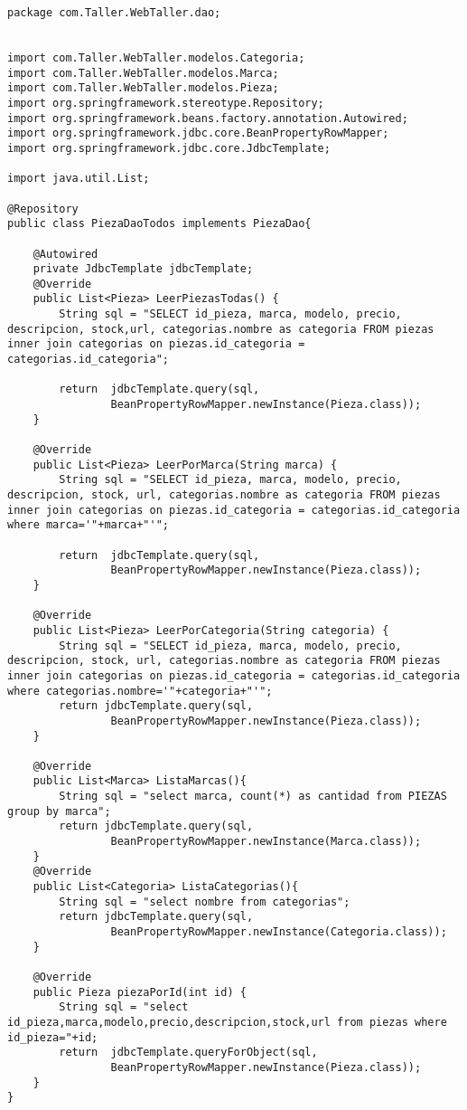 \begin{lstlisting}[caption=PiezaDaoTodos.java (LMSI)]
package com.Taller.WebTaller.dao;


import com.Taller.WebTaller.modelos.Categoria;
import com.Taller.WebTaller.modelos.Marca;
import com.Taller.WebTaller.modelos.Pieza;
import org.springframework.stereotype.Repository;
import org.springframework.beans.factory.annotation.Autowired;
import org.springframework.jdbc.core.BeanPropertyRowMapper;
import org.springframework.jdbc.core.JdbcTemplate;

import java.util.List;

@Repository
public class PiezaDaoTodos implements PiezaDao{

    @Autowired
    private JdbcTemplate jdbcTemplate;
    @Override
    public List<Pieza> LeerPiezasTodas() {
        String sql = "SELECT id_pieza, marca, modelo, precio, descripcion, stock,url, categorias.nombre as categoria FROM piezas inner join categorias on piezas.id_categoria = categorias.id_categoria";

        return  jdbcTemplate.query(sql,
                BeanPropertyRowMapper.newInstance(Pieza.class));
    }

    @Override
    public List<Pieza> LeerPorMarca(String marca) {
        String sql = "SELECT id_pieza, marca, modelo, precio, descripcion, stock, url, categorias.nombre as categoria FROM piezas inner join categorias on piezas.id_categoria = categorias.id_categoria where marca='"+marca+"'";

        return  jdbcTemplate.query(sql,
                BeanPropertyRowMapper.newInstance(Pieza.class));
    }

    @Override
    public List<Pieza> LeerPorCategoria(String categoria) {
        String sql = "SELECT id_pieza, marca, modelo, precio, descripcion, stock, url, categorias.nombre as categoria FROM piezas inner join categorias on piezas.id_categoria = categorias.id_categoria where categorias.nombre='"+categoria+"'";
        return jdbcTemplate.query(sql,
                BeanPropertyRowMapper.newInstance(Pieza.class));
    }

    @Override
    public List<Marca> ListaMarcas(){
        String sql = "select marca, count(*) as cantidad from PIEZAS group by marca";
        return jdbcTemplate.query(sql,
                BeanPropertyRowMapper.newInstance(Marca.class));
    }
    @Override
    public List<Categoria> ListaCategorias(){
        String sql = "select nombre from categorias";
        return jdbcTemplate.query(sql,
                BeanPropertyRowMapper.newInstance(Categoria.class));
    }

    @Override
    public Pieza piezaPorId(int id) {
        String sql = "select id_pieza,marca,modelo,precio,descripcion,stock,url from piezas where id_pieza="+id;
        return  jdbcTemplate.queryForObject(sql,
                BeanPropertyRowMapper.newInstance(Pieza.class));
    }
}
\end{lstlisting}
\clearpage